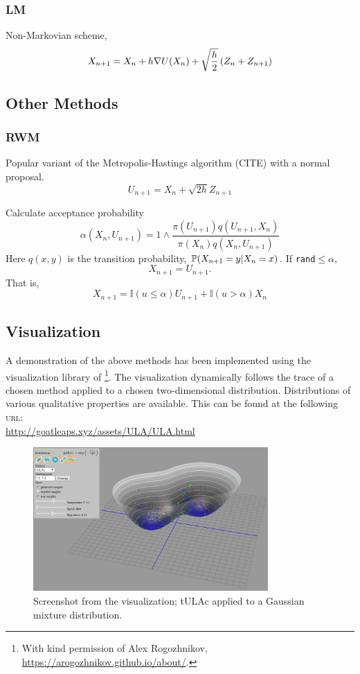 \subsubsection{LM}
\cite{LM12}
Non-Markovian scheme,
\[X_{n+1} = X_n +h \grad U(X_n) + \sqrt{\frac{h}{2}} \left(Z_n + Z_{n+1}\right) \]


\subsection{Other Methods}
\subsubsection{RWM}
Popular variant of the Metropolis-Hastings algorithm (CITE) with a normal proposal.
\[U_{n+1} = X_n + \sqrt{2h} Z_{n+1}\]

Calculate acceptance probability
\[\alpha(X_n,U_{n+1}) = 1\wedge \frac{\pi(U_{n+1})q(U_{n+1},X_n)}{\pi(X_n)q(X_n,U_{n+1})}\]
Here \(q(x,y)\) is the transition probability, \(\P(X_{n+1}=y | X_{n}=x)\). If \texttt{rand}\(\leq\alpha\),
\[X_{n+1} = U_{n+1}.\]
That is,
\[X_{n+1} = \mathbb{I}(u\leq \alpha)U_{n+1} +\mathbb{I}(u > \alpha)X_n \]

\subsection{Visualization}
A demonstration of the above methods has been implemented using the visualization library of \cite{rogozhnikov2016hmc}\footnote{With kind permission of Alex Rogozhnikov, \url{https://arogozhnikov.github.io/about/}.}. The visualization dynamically follows the trace of a chosen method applied to a chosen two-dimensional distribution. Distributions of various qualitative properties are available. This can be found at the following \textsc{url}: \\

   \centering\url{http://goatleaps.xyz/assets/ULA/ULA.html}

\begin{figure}[H]
\centering
  \begin{minipage}[b]{0.8\textwidth}
  \centering
    \includegraphics[width=0.8\textwidth]{Figures/ulavis.PNG}
    \caption{Screenshot from the visualization;  tULAc applied to a Gaussian mixture distribution.}
  \end{minipage}
\end{figure}